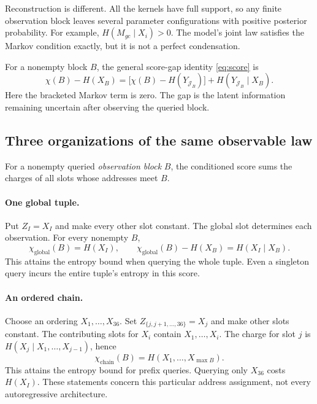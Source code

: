 \documentclass[11pt]{article}
\begin{document}
Reconstruction is different. All the kernels have full support, so any
finite observation block leaves several parameter configurations with positive
posterior probability. For example, $H(M_{gc}\mid X_i)>0$. The model's joint
law satisfies the Markov condition exactly, but it is not a perfect condensation.

For a nonempty block $B$, the general score-gap identity \eqref{eq:score} is
\[
 \chi(B)-H(X_B)
 =\bigl[\chi(B)-H(Y_{\mathcal J_B})\bigr]
   +H(Y_{\mathcal J_B}\mid X_B).
\]
Here the bracketed Markov term is zero. The gap is the latent information
remaining uncertain after observing the queried block.

\subsection{Three organizations of the same observable law}
For a nonempty queried \emph{observation block} $B$, the conditioned score
sums the charges of all slots whose addresses meet $B$.

\paragraph{One global tuple.}
Put $Z_I=X_I$ and make every other slot constant. The global slot determines
each observation. For every nonempty $B$,
\[
 \chi_{\mathrm{global}}(B)=H(X_I),\qquad
 \chi_{\mathrm{global}}(B)-H(X_B)=H(X_I\mid X_B).
\]
This attains the entropy bound when querying the whole tuple. Even a singleton
query incurs the entire tuple's entropy in this score.

\paragraph{An ordered chain.}
Choose an ordering $X_1,\ldots,X_{36}$. Set
$Z_{\{j,j+1,\ldots,36\}}=X_j$ and make other slots constant. The contributing
slots for $X_i$ contain $X_1,\ldots,X_i$. The charge for slot $j$ is
$H(X_j\mid X_1,\ldots,X_{j-1})$, hence
\[
 \chi_{\mathrm{chain}}(B)=H(X_1,\ldots,X_{\max B}).
\]
This attains the entropy bound for prefix queries. Querying only $X_{36}$ costs
$H(X_I)$. These statements concern this particular address assignment, not
every autoregressive architecture.
\end{document}
